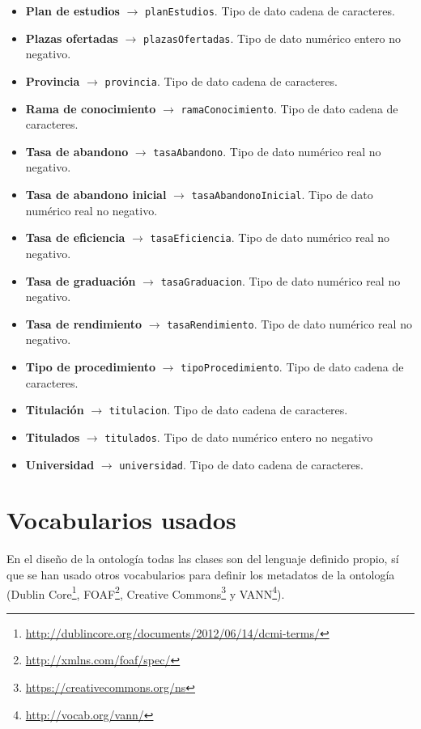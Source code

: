 \begin{itemize}
	\item \textbf{Plan de estudios} $\rightarrow$ {\tt planEstudios}. Tipo de dato cadena de caracteres.
	\item \textbf{Plazas ofertadas} $\rightarrow$ {\tt plazasOfertadas}. Tipo de dato numérico entero no negativo.
	\item \textbf{Provincia} $\rightarrow$ {\tt provincia}. Tipo de dato cadena de caracteres.
	\item \textbf{Rama de conocimiento} $\rightarrow$ {\tt ramaConocimiento}. Tipo de dato cadena de caracteres.
	\item \textbf{Tasa de abandono} $\rightarrow$ {\tt tasaAbandono}. Tipo de dato numérico real no negativo.
	\item \textbf{Tasa de abandono inicial} $\rightarrow$ {\tt tasaAbandonoInicial}. Tipo de dato numérico real no negativo.
	\item \textbf{Tasa de eficiencia} $\rightarrow$ {\tt tasaEficiencia}. Tipo de dato numérico real no negativo.
	\item \textbf{Tasa de graduación} $\rightarrow$ {\tt tasaGraduacion}. Tipo de dato numérico real no negativo.
	\item \textbf{Tasa de rendimiento} $\rightarrow$ {\tt tasaRendimiento}. Tipo de dato numérico real no negativo.
	\item \textbf{Tipo de procedimiento} $\rightarrow$ {\tt tipoProcedimiento}. Tipo de dato cadena de caracteres.
	\item \textbf{Titulación} $\rightarrow$ {\tt titulacion}. Tipo de dato cadena de caracteres.
	\item \textbf{Titulados} $\rightarrow$ {\tt titulados}. Tipo de dato numérico entero no negativo
	\item \textbf{Universidad} $\rightarrow$ {\tt universidad}. Tipo de dato cadena de caracteres.
\end{itemize}

\newpage
\section{Vocabularios usados}

En el diseño de la ontología todas las clases son del lenguaje definido propio, sí que se han usado otros vocabularios para definir los metadatos de la ontología ({\sf Dublin Core}\footnote{\url{http://dublincore.org/documents/2012/06/14/dcmi-terms/}}, {\sf FOAF}\footnote{\url{http://xmlns.com/foaf/spec/}}, {\sf Creative Commons}\footnote{\url{https://creativecommons.org/ns}} y {\sf VANN}\footnote{\url{http://vocab.org/vann/}}). \bigskip

